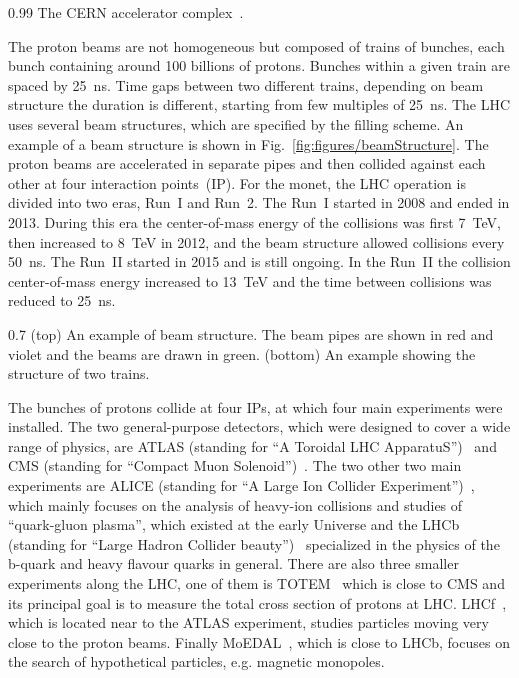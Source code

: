                  {0.99}       %
                 { The CERN accelerator complex~\cite{Mobs:2225847}. }

The proton beams are not homogeneous but composed of trains of bunches, each bunch containing around 100 billions of protons. Bunches within a given train are spaced by 25~ns. Time gaps between two different trains, depending on beam structure the duration is different, starting from few multiples of 25~ns. The LHC uses several beam structures, which are specified by the filling scheme. An example of a beam structure is shown in Fig.~\ref{fig:figures/beamStructure}. The proton beams are accelerated in separate pipes and then collided against each other at four interaction points~(IP). For the monet, the LHC operation is divided into two eras, Run~I and Run~2. The Run~I started in 2008 and ended in 2013. During this era the center-of-mass energy of the collisions was first 7~TeV, then increased to 8~TeV in 2012, and the beam structure allowed collisions every 50~ns. The Run~II started in 2015 and is still ongoing. In the Run~II the collision center-of-mass energy increased to 13~TeV and the time between collisions was reduced to 25~ns.

                 {0.7}       %
                 { (top) An example of beam structure. The beam pipes are shown in red and violet and the beams are drawn in green. (bottom) An example showing the structure of two trains. }

The bunches of protons collide at four IPs, at which four main experiments were installed. The two general-purpose detectors, which were designed to cover a wide range of physics, are ATLAS (standing for ``A Toroidal  LHC ApparatuS'')~\cite{Aad:2008zzm} and CMS (standing for ``Compact Muon Solenoid'')~\cite{Chatrchyan:2008aa}. The two other two main experiments are ALICE (standing for ``A Large Ion Collider Experiment'')~\cite{Aamodt:2008zz}, which mainly focuses on the analysis of heavy-ion collisions and studies of ``quark-gluon plasma'', which existed at the early Universe and the LHCb (standing for ``Large Hadron Collider beauty'')~\cite{Alves:2008zz} specialized in the physics of the b-quark and heavy flavour quarks in general. There are also three smaller experiments along the LHC, one of them is TOTEM~\cite{Anelli:2008zza} which is close to CMS and its principal goal is to measure the total cross section of protons at LHC. LHCf~\cite{Adriani:2008zz}, which is located near to the ATLAS experiment, studies particles moving very close to the proton beams. Finally MoEDAL~\cite{Acharya:2014nyr}, which is close to LHCb, focuses on the search of hypothetical particles, e.g. magnetic monopoles.

